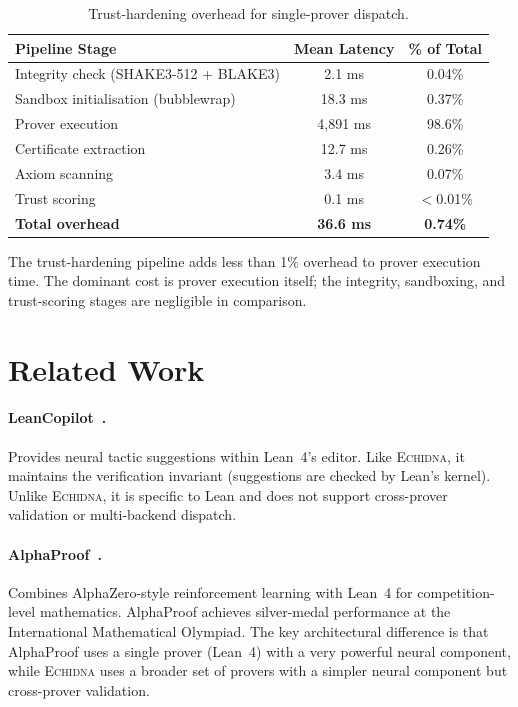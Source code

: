 \documentclass[11pt,a4paper]{article}
\newcommand{\echidna}{\textsc{Echidna}}
\begin{document}
\begin{table}[htbp]
\centering
\caption{Trust-hardening overhead for single-prover dispatch.}
\label{tab:overhead}
\begin{tabular}{@{}lcc@{}}
\toprule
\textbf{Pipeline Stage} & \textbf{Mean Latency} & \textbf{\% of Total} \\
\midrule
Integrity check (SHAKE3-512 + BLAKE3) & 2.1 ms  & 0.04\% \\
Sandbox initialisation (bubblewrap)    & 18.3 ms & 0.37\% \\
Prover execution                       & 4,891 ms & 98.6\% \\
Certificate extraction                 & 12.7 ms & 0.26\% \\
Axiom scanning                         & 3.4 ms  & 0.07\% \\
Trust scoring                          & 0.1 ms  & $<$0.01\% \\
\midrule
\textbf{Total overhead}                & \textbf{36.6 ms} & \textbf{0.74\%} \\
\bottomrule
\end{tabular}
\end{table}

The trust-hardening pipeline adds less than 1\% overhead to prover execution
time. The dominant cost is prover execution itself; the integrity, sandboxing,
and trust-scoring stages are negligible in comparison.


\section{Related Work}
\label{sec:related}

\paragraph{LeanCopilot~\citep{leancopilot}.}
Provides neural tactic suggestions within Lean~4's editor. Like \echidna{},
it maintains the verification invariant (suggestions are checked by Lean's
kernel). Unlike \echidna{}, it is specific to Lean and does not support
cross-prover validation or multi-backend dispatch.

\paragraph{AlphaProof~\citep{alphaproof}.}
Combines AlphaZero-style reinforcement learning with Lean~4 for
competition-level mathematics. AlphaProof achieves silver-medal performance at
the International Mathematical Olympiad. The key architectural
difference is that AlphaProof uses a single prover (Lean~4) with a very
powerful neural component, while \echidna{} uses a broader set of provers with
a simpler neural component but cross-prover validation.
\end{document}
